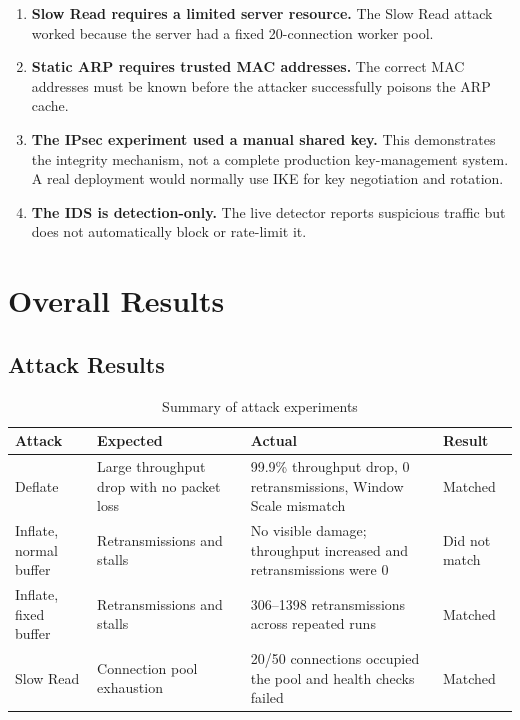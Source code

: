 \documentclass[11pt]{article}
\begin{document}
\begin{enumerate}
    \item \textbf{Slow Read requires a limited server resource.}
    The Slow Read attack worked because the server had a fixed
    20-connection worker pool.

    \item \textbf{Static ARP requires trusted MAC addresses.}
    The correct MAC addresses must be known before the attacker
    successfully poisons the ARP cache.

    \item \textbf{The IPsec experiment used a manual shared key.}
    This demonstrates the integrity mechanism, not a complete
    production key-management system. A real deployment would normally
    use IKE for key negotiation and rotation.

    \item \textbf{The IDS is detection-only.}
    The live detector reports suspicious traffic but does not
    automatically block or rate-limit it.
\end{enumerate}

\section{Overall Results}

\subsection{Attack Results}

\begin{table}[h]
\centering
\begin{tabular}{p{2.8cm}p{4cm}p{4.2cm}p{2.2cm}}
\toprule
Attack & Expected & Actual & Result \\
\midrule
Deflate
&
Large throughput drop with no packet loss
&
99.9\% throughput drop, 0 retransmissions, Window Scale mismatch
&
Matched
\\

Inflate, normal buffer
&
Retransmissions and stalls
&
No visible damage; throughput increased and retransmissions were 0
&
Did not match
\\

Inflate, fixed buffer
&
Retransmissions and stalls
&
306--1398 retransmissions across repeated runs
&
Matched
\\

Slow Read
&
Connection pool exhaustion
&
20/50 connections occupied the pool and health checks failed
&
Matched
\\
\bottomrule
\end{tabular}
\caption{Summary of attack experiments}
\end{table}
\end{document}
